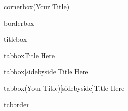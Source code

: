 \begin{MDFdefbox}{cornerbox}(Your Title)
    \blindtext%
\end{MDFdefbox}
\begin{MDFdefbox}{borderbox}
    \blindtext%
\end{MDFdefbox}
\begin{MDFdefbox}{titlebox}
    \blindtext%
\end{MDFdefbox}
\begin{MDFdefbox}{tabbox}{Title Here}
    \blindtext%
\end{MDFdefbox}
\begin{MDFdefbox}{tabbox}[sidebyside]{Title Here}
    \blindtext%
    \tcblower
    \blindtext%
\end{MDFdefbox}
\begin{MDFdefbox}{tabbox}(Your Title)[sidebyside]{Title Here}
    \blindtext%
    \tcblower
    \blindtext%
\end{MDFdefbox}
\begin{MDFdefbox}{tcborder}%
    \blindtext%
\end{MDFdefbox}%
\begin{tcbnote}
    \blindtext%
\end{tcbnote}%
